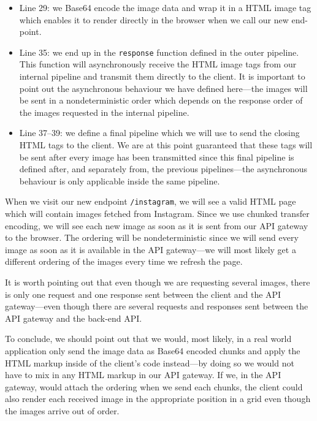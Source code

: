 \documentclass{cslthse-msc}
\begin{document}
\begin{itemize}
\item Line 29: we Base64 encode the image data and wrap it in a HTML image tag which enables it to render directly in the browser when we call our new end-point.

\item Line 35: we end up in the \lstinline{response} function defined in the outer pipeline. This function will asynchronously receive the HTML image tags from our internal pipeline and transmit them directly to the client. It is important to point out the asynchronous behaviour we have defined here---the images will be sent in a nondeterministic order which depends on the response order of the images requested in the internal pipeline.

\item Line 37--39: we define a final pipeline which we will use to send the closing HTML tags to the client. We are at this point guaranteed that these tags will be sent after every image has been transmitted since this final pipeline is defined after, and separately from, the previous pipelines---the asynchronous behaviour is only applicable inside the same pipeline.

\end{itemize}

When we visit our new endpoint \lstinline{/instagram}, we will see a valid HTML page which will contain images fetched from Instagram. Since we use chunked transfer encoding, we will see each new image as soon as it is sent from our API gateway to the browser. The ordering will be nondeterministic since we will send every image as soon as it is available in the API gateway---we will most likely get a different ordering of the images every time we refresh the page.

It is worth pointing out that even though we are requesting several images, there is only one request and one response sent between the client and the API gateway---even though there are several requests and responses sent between the API gateway and the back-end API.

To conclude, we should point out that we would, most likely, in a real world application only send the image data as Base64 encoded chunks and apply the HTML markup inside of the client's code instead---by doing so we would not have to mix in any HTML markup in our API gateway. If we, in the API gateway, would attach the ordering when we send each chunks, the client could also render each received image in the appropriate position in a grid even though the images arrive out of order.
\end{document}
